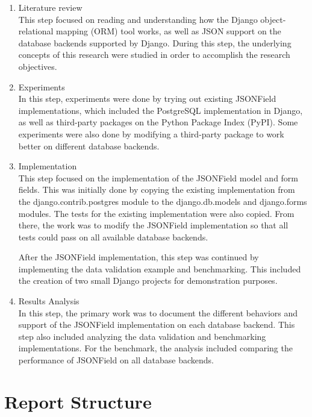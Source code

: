 \begin{enumerate}
    \item Literature review \\
    This step focused on reading and understanding how the Django
    object-relational mapping (ORM) tool works, as well as JSON support on the
    database backends supported by Django. During this step, the underlying
    concepts of this research were studied in order to accomplish the research
    objectives.

    \item Experiments \\
    In this step, experiments were done by trying out existing JSONField
    implementations, which included the PostgreSQL implementation in Django,
    as well as third-party packages on the Python Package Index (PyPI). Some
    experiments were also done by modifying a third-party package to work
    better on different database backends.

    \item Implementation \\
    This step focused on the implementation of the JSONField model and form
    fields. This was initially done by copying the existing implementation
    from the django.contrib.postgres module to the django.db.models and
    django.forms modules. The tests for the existing implementation were also
    copied. From there, the work was to modify the JSONField implementation so
    that all tests could pass on all available database backends.

    After the JSONField implementation, this step was continued by implementing
    the data validation example and benchmarking. This included the creation of
    two small Django projects for demonstration purposes.

    \item Results Analysis \\
    In this step, the primary work was to document the different behaviors and
    support of the JSONField implementation on each database backend. This step
    also included analyzing the data validation and benchmarking
    implementations. For the benchmark, the analysis included comparing the
    performance of JSONField on all database backends.
\end{enumerate}

\section{Report Structure}

